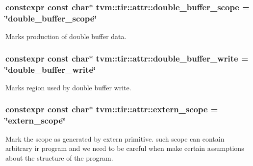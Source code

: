 \subsubsection[{\texorpdfstring{double\+\_\+buffer\+\_\+scope}{double_buffer_scope}}]{\setlength{\rightskip}{0pt plus 5cm}constexpr const char$\ast$ tvm\+::tir\+::attr\+::double\+\_\+buffer\+\_\+scope = \char`\"{}double\+\_\+buffer\+\_\+scope\char`\"{}}\hypertarget{namespacetvm_1_1tir_1_1attr_a9231fc0afe37a8d46a90a1c5fdf522bb}{}\label{namespacetvm_1_1tir_1_1attr_a9231fc0afe37a8d46a90a1c5fdf522bb}


Marks production of double buffer data. 

\subsubsection[{\texorpdfstring{double\+\_\+buffer\+\_\+write}{double_buffer_write}}]{\setlength{\rightskip}{0pt plus 5cm}constexpr const char$\ast$ tvm\+::tir\+::attr\+::double\+\_\+buffer\+\_\+write = \char`\"{}double\+\_\+buffer\+\_\+write\char`\"{}}\hypertarget{namespacetvm_1_1tir_1_1attr_af84871a6d841168f8501f141676dfaeb}{}\label{namespacetvm_1_1tir_1_1attr_af84871a6d841168f8501f141676dfaeb}


Marks region used by double buffer write. 

\subsubsection[{\texorpdfstring{extern\+\_\+scope}{extern_scope}}]{\setlength{\rightskip}{0pt plus 5cm}constexpr const char$\ast$ tvm\+::tir\+::attr\+::extern\+\_\+scope = \char`\"{}extern\+\_\+scope\char`\"{}}\hypertarget{namespacetvm_1_1tir_1_1attr_a4bd38b620e1e9907216f3e583839dea3}{}\label{namespacetvm_1_1tir_1_1attr_a4bd38b620e1e9907216f3e583839dea3}


Mark the scope as generated by extern primitive. such scope can contain arbitrary ir program and we need to be careful when make certain assumptions about the structure of the program. 

